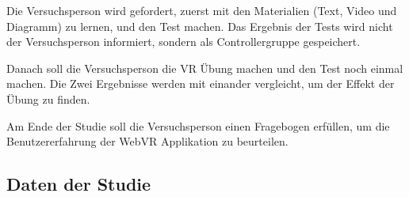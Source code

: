 Die Versuchsperson wird gefordert, zuerst mit den Materialien (Text, Video und Diagramm) zu lernen, und den Test machen. Das Ergebnis der Tests wird nicht der Versuchsperson informiert, sondern als Controllergruppe gespeichert.

Danach soll die Versuchsperson die VR Übung machen und den Test noch einmal machen. Die Zwei Ergebnisse werden mit einander vergleicht, um der Effekt der Übung zu finden.

Am Ende der Studie soll die Versuchsperson einen Fragebogen erfüllen, um die Benutzererfahrung der WebVR Applikation zu beurteilen.

\subsection{Daten der Studie}










